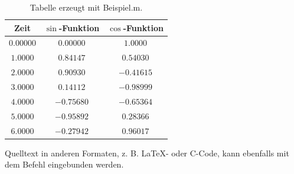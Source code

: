 \begin{table}[htb]
    \centering
    \caption{Tabelle erzeugt mit Beispiel.m.}
    \label{tab:Beispieltabelle}
    \begin{tabular}{ccc}
        \toprule
        Zeit & $\sin$-Funktion & $\cos$-Funktion\\
        \midrule
        $0.00000$ & $0.00000$ & $1.0000$ \\
        $1.0000$ & $0.84147$ & $0.54030$ \\
        $2.0000$ & $0.90930$ & $-0.41615$ \\
        $3.0000$ & $0.14112$ & $-0.98999$ \\
        $4.0000$ & $-0.75680$ & $-0.65364$ \\
        $5.0000$ & $-0.95892$ & $0.28366$ \\
        $6.0000$ & $-0.27942$ & $0.96017$ \\
        \bottomrule
    \end{tabular}
\end{table}

Quelltext in anderen Formaten, z. B. \LaTeX- oder C-Code, kann ebenfalls mit dem Befehl \verb|| eingebunden werden.